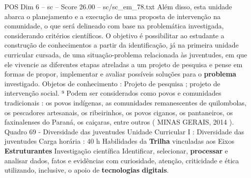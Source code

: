 \begin{textsample}{POS Dim 6 – sc – Score 26.00 – sc/sc\_em\_78.txt}
Além disso, esta unidade abarca o planejamento e a execução de uma proposta de intervenção na comunidade, o que será delineado com base na problemática investigada, considerando critérios científicos.
O objetivo é possibilitar ao estudante a construção de conhecimentos a partir da identificação, já na primeira unidade curricular cursada, de uma situação-problema relacionada às juventudes, em que ele vivencie as diferentes etapas atreladas a um projeto de pesquisa e pense em formas de propor, implementar e avaliar possíveis soluções para o \textbf{problema} investigado.
Objetos de conhecimento : Projeto de pesquisa ; projeto de intervenção social. ⁹ Podem ser considerados como povos e comunidades tradicionais : os povos indígenas, as comunidades remanescentes de quilombolas, os pescadores artesanais, os ribeirinhos, os povos ciganos, os pantaneiros, os faxinalenses do Paraná, os caiçaras, entre outros ( MINAS GERAIS, 2014 ).
Quadro 69 - Diversidade das juventudes Unidade Curricular I : Diversidade das juventudes Carga horária : 40 h Habilidades da \textbf{Trilha} vinculadas aos Eixos \textbf{Estruturantes} Investigação científica Identificar, selecionar, \textbf{processar} e analisar dados, fatos e evidências com curiosidade, atenção, criticidade e ética utilizando, inclusive, o apoio de \textbf{tecnologias} \textbf{digitais}.

\end{textsample}
